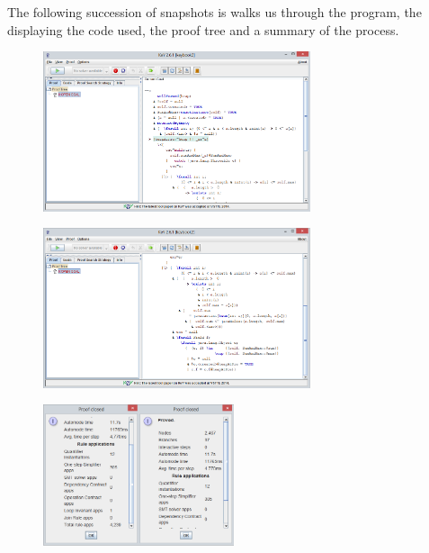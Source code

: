 \documentclass[a4paper]{article}
\begin{document}
	The following succession of snapshots is walks us through the program, the displaying the code used, the proof tree and a summary of the process. 
	
	\begin{figure}[h!]
		\centering
		\includegraphics[width=0.7\textwidth, scale=0.7]{421.png}
		\caption*{}
		\label{1}
	\end{figure}	
	
	\begin{figure}[h!]
		\centering
		\includegraphics[width=0.7\textwidth, scale=0.7]{422.png}
		\caption*{}
		\label{2}
	\end{figure}
	
	\begin{figure}[h!]
		\centering
		\includegraphics[width=0.5\textwidth, scale=0.05]{424.png}
		\caption*{}
		\label{3}
	\end{figure}	
\end{document}
